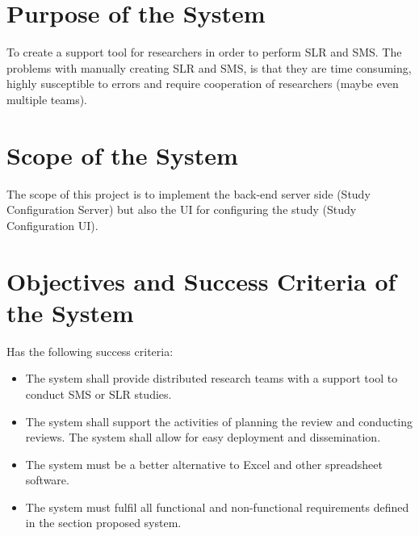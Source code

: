 
\section{Purpose of the System}
\label{sec:purpose}
To create a support tool for researchers in order to perform SLR and SMS. 
The problems with manually creating SLR and SMS, is that they are time consuming, highly susceptible to errors and require cooperation of researchers (maybe even multiple teams).

\section{Scope of the System}
\label{sec:scope}
The scope of this project is to implement the back-end server side (Study Configuration Server) but also the UI for configuring the study (Study Configuration UI).

%


\section{Objectives and Success Criteria of the System}
Has the following success criteria:

\begin{itemize}
	\item The system shall provide distributed research teams with a support tool to conduct SMS or SLR studies. 
	\item The system shall support the activities of planning the review and conducting reviews. The system shall allow for easy deployment and dissemination.
	\item The system must be a better alternative to Excel and other spreadsheet software.
	\item The system must fulfil all functional and non-functional requirements defined in the section proposed system.
\end{itemize}

